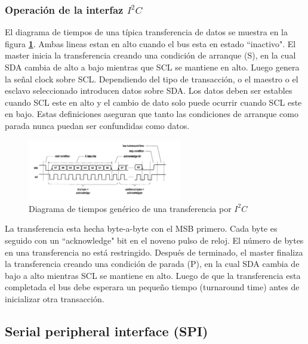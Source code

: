 \documentclass[11pt, a4paper]{article}
\begin{document}
		\subsubsection{Operación de la interfaz $I^{2}C$}
			El diagrama de tiempos de una típica transferencia de datos se muestra en la figura \textcolor{blue}{\textbf{\ref{fig:basic_timing}}}. Ambas lineas estan en alto cuando el bus esta en estado ``inactivo". El master inicia la transferencia creando una condición de arranque (S), en la cual SDA cambia de alto a bajo mientras que SCL se mantiene en alto. Luego genera la señal clock sobre SCL. Dependiendo del tipo de transacción, o el maestro o el esclavo seleccionado introducen datos sobre SDA. Los datos deben ser estables cuando SCL este en alto y el cambio de dato solo puede ocurrir cuando SCL este en bajo. Estas definiciones aseguran que tanto las condiciones de arranque como parada nunca puedan ser confundidas como datos.
			
		\begin{figure}[H]
			\centering
			\includegraphics[width=0.6\textwidth]{Imagenes/basic_timing.png}
			\caption{Diagrama de tiempos genérico de una transferencia por $I^{2}C$}
			\label{fig:basic_timing}
		\end{figure} 

			La transferencia esta hecha byte-a-byte con el MSB primero. Cada byte es seguido con un ``acknowledge" bit en el noveno pulso de reloj. El número de bytes en una transferencia no está restringido. Después de terminado, el master finaliza la transferencia creando una condición de parada (P), en la cual SDA cambia de bajo a alto mientras SCL se mantiene en alto. Luego de que la transferencia esta completada el bus debe esperara un pequeño tiempo (turnaround time) antes de inicializar otra transacción.
	\subsection{Serial peripheral interface (SPI)}
\end{document}
